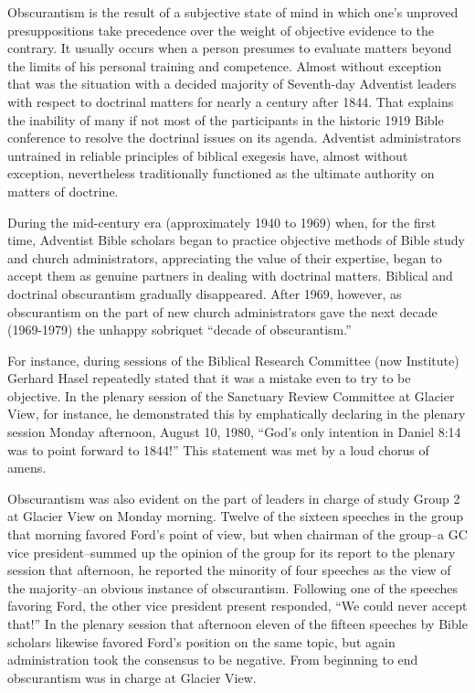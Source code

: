 Obscurantism is the result of a subjective state of mind in which one's
unproved presuppositions take precedence over the weight of objective
evidence to the contrary. It usually occurs when a person presumes to evaluate
matters beyond the limits of his personal training and competence.
Almost without exception that was the situation with a decided majority
of Seventh-day Adventist leaders with respect to doctrinal matters for nearly
a century after 1844. That explains the inability of many if not most of the
participants in the historic 1919 Bible conference to resolve the doctrinal
issues on its agenda. Adventist administrators untrained in reliable principles of
biblical exegesis have, almost without exception, nevertheless traditionally
functioned as the ultimate authority on matters of doctrine.

During the mid-century era (approximately 1940 to 1969) when, for the first
time, Adventist Bible scholars began to practice objective methods of Bible
study and church administrators, appreciating the value of their expertise,
began to accept them as genuine partners in dealing with doctrinal matters.
Biblical and doctrinal obscurantism gradually disappeared. After 1969,
however, as obscurantism on the part of new church administrators gave the
next decade (1969-1979) the unhappy sobriquet ``decade of obscurantism.''

For instance, during sessions of the Biblical Research Committee (now
Institute) Gerhard Hasel repeatedly stated that it was a mistake even to try
to be objective. In the plenary session of the Sanctuary Review Committee at
Glacier View, for instance, he demonstrated this by emphatically declaring
in the plenary session Monday afternoon, August 10, 1980, ``God's only
intention in Daniel 8:14 was to point forward to 1844!'' This statement was
met by a loud chorus of amens.

Obscurantism was also evident on the part of leaders in charge of study
Group 2 at Glacier View on Monday morning. Twelve of the sixteen speeches in
the group that morning favored Ford's point of view, but when chairman of
the group--a GC vice president--summed up the opinion of the group for its
report to the plenary session that afternoon, he reported the minority of
four speeches as the view of the majority--an obvious instance of
obscurantism. Following one of the speeches favoring Ford, the other vice
president present responded, ``We could never accept that!'' In the plenary
session that afternoon eleven of the fifteen speeches by Bible scholars
likewise favored Ford's position on the same topic, but again administration 
took the consensus to be negative. From beginning to end obscurantism was in
charge at Glacier View.

